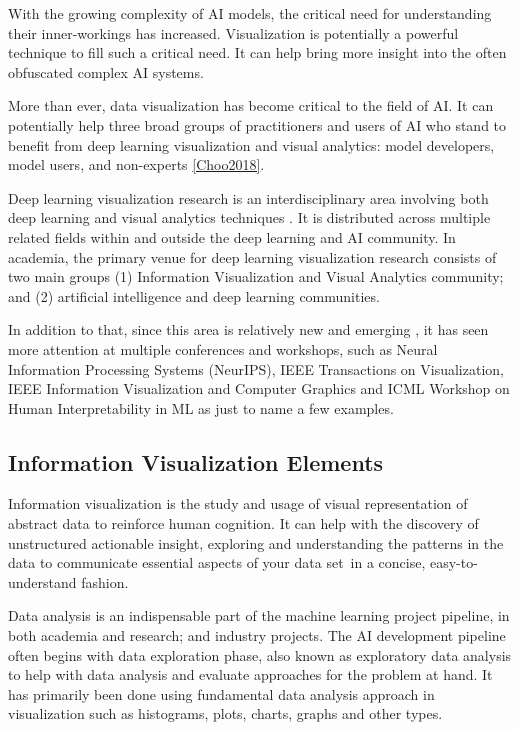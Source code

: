 With the growing complexity of AI models, the critical need for understanding their inner-workings has increased. Visualization is potentially a powerful technique to fill such a critical need. It can help bring more insight into the often obfuscated complex AI systems.

More than ever, data visualization has become critical to the field of AI. It can potentially help three broad groups of practitioners and users of AI who stand to benefit from deep learning visualization and visual analytics: model developers, model users, and non-experts \ref{Choo2018}.

Deep learning visualization research is an interdisciplinary area involving both deep learning and visual analytics techniques \cite{Choo2018}. It is distributed across multiple related fields within and outside the deep learning and AI community. In academia, the primary venue for deep learning visualization research consists of two main groups (1) Information Visualization and Visual Analytics community; and (2) artificial intelligence and deep learning communities. 

In addition to that, since this area is relatively new and emerging \cite{Choo2018}, it has seen more attention at multiple conferences and workshops, such as Neural Information Processing Systems (NeurIPS), IEEE Transactions on Visualization, IEEE Information Visualization and Computer Graphics and ICML Workshop on Human Interpretability in ML as just to name a few examples.

\subsection{Information Visualization Elements}

Information visualization is the study and usage of visual representation of abstract data to reinforce human cognition. It can help with the discovery of unstructured actionable insight, exploring and understanding the patterns in the data to communicate essential aspects of your data set in a concise, easy-to-understand fashion.

Data analysis is an indispensable part of the machine learning project pipeline, in both academia and research; and industry projects. The AI development pipeline often begins with data exploration phase, also known as exploratory data analysis to help with data analysis and evaluate approaches for the problem at hand. It has primarily been done using fundamental data analysis approach in visualization such as histograms, plots, charts, graphs and other types.

